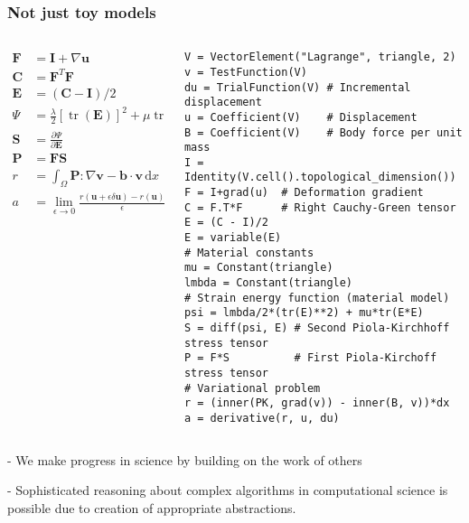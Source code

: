 \documentclass[presentation]{beamer}
\DeclareMathOperator{\tr}{tr}
\begin{document}
\begin{frame}[fragile]
  \frametitle{Not just toy models}
  \begin{columns}
    \begin{column}{0.4\textwidth}
      \begin{align*}
        \mathbf{F} &= \mathbf{I} + \nabla \mathbf{u}\\
        \mathbf{C} &= \mathbf{F}^T \mathbf{F}\\
        \mathbf{E} &= (\mathbf{C} - \mathbf{I}) / 2\\
        \Psi &= \frac{\lambda}{2}[\tr(\mathbf{E})]^2 + \mu \tr(\mathbf{E}^2)\\
        \mathbf{S} &= \frac{\partial \Psi}{\partial \mathbf{E}}\\
        \mathbf{P} &= \mathbf{F} \mathbf{S}\\
        r &= \int_\Omega \mathbf{P} : \nabla \mathbf{v} - \mathbf{b} \cdot \mathbf{v}\,\text{d}x\\
        a &= \lim_{\epsilon \to 0} \frac{r(\mathbf{u} + \epsilon \delta \mathbf{u}) - r(\mathbf{u})}{\epsilon}
      \end{align*}
    \end{column}
    \begin{column}{0.6\textwidth}
\begin{verbatim}
V = VectorElement("Lagrange", triangle, 2)
v = TestFunction(V)
du = TrialFunction(V) # Incremental displacement
u = Coefficient(V)    # Displacement
B = Coefficient(V)    # Body force per unit mass
I = Identity(V.cell().topological_dimension())
F = I+grad(u)  # Deformation gradient
C = F.T*F      # Right Cauchy-Green tensor
E = (C - I)/2
E = variable(E)
# Material constants
mu = Constant(triangle)
lmbda = Constant(triangle)
# Strain energy function (material model)
psi = lmbda/2*(tr(E)**2) + mu*tr(E*E)
S = diff(psi, E) # Second Piola-Kirchhoff stress tensor
P = F*S          # First Piola-Kirchoff stress tensor
# Variational problem
r = (inner(PK, grad(v)) - inner(B, v))*dx
a = derivative(r, u, du)
\end{verbatim}
    \end{column}
  \end{columns}
\end{frame}

- We make progress in science by building on the work of others

- Sophisticated reasoning about complex algorithms in computational
science is possible due to creation of appropriate abstractions.
\end{document}
